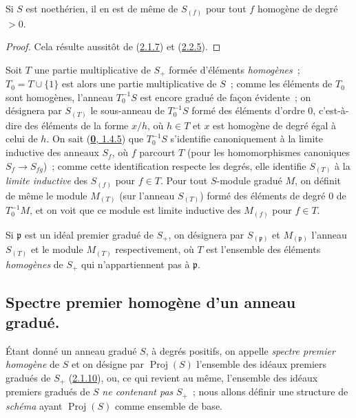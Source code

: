 \begin{corollary}[2.2.6]
\label{II.2.2.6-fr}
Si $S$ est noethérien, il en est de même de $S_{(f)}$ pour tout $f$ homogène
de degré $>0$.
\end{corollary}

\begin{proof}
Cela résulte aussitôt de (\hyperref[II.2.1.7-fr]{2.1.7}) et
(\hyperref[II.2.2.5-fr]{2.2.5}).
\end{proof}

\begin{env}[2.2.7]
\label{II.2.2.7-fr}
Soit $T$ une partie multiplicative de $S_+$ formée d'éléments
\emph{homogènes}~; $T_0=T\cup\{1\}$ est alors une partie multiplicative de
$S$~; comme les éléments de $T_0$ sont homogènes, l'anneau $T_0^{-1}S$ est
encore gradué de façon évidente~; on désignera par $S_{(T)}$ le sous-anneau
de $T_0^{-1}S$ formé des éléments d'ordre $0$, c'est-à-dire des éléments de
la forme $x/h$, où $h\in T$ et $x$ est homogène de degré égal à celui de
$h$. On sait (\hyperref[0.1.4.5-fr]{\textbf{0}, 1.4.5}) que $T_0^{-1}S$ s'identifie
canoniquement à la limite inductive des anneaux $S_f$, où $f$ parcourt $T$
(pour les homomorphismes canoniques $S_f\to S_{fg}$)~; comme cette
identification respecte les degrés, elle identifie $S_{(T)}$ à la
\emph{limite inductive} des $S_{(f)}$ pour $f\in T$. Pour tout $S$-module
gradué $M$, on définit de même le module $M_{(T)}$ (sur l'anneau $S_{(T)}$)
formé des éléments de degré $0$ de $T_0^{-1}M$, et on voit que ce module est
limite inductive des $M_{(f)}$ pour $f\in T$.

Si $\mathfrak{p}$ est un idéal premier gradué de $S_+$, on désignera par
$S_{(\mathfrak{p})}$ et $M_{(\mathfrak{p})}$ l'anneau $S_{(T)}$ et le
module $M_{(T)}$ respectivement, où $T$ est l'ensemble des éléments
\emph{homogènes} de $S_+$ qui n'appartiennent pas à $\mathfrak{p}$.
\end{env}

\subsection{Spectre premier homogène d'un anneau gradué.}
\label{subsection:II.2.3-fr}

\begin{env}[2.3.1]
\label{II.2.3.1-fr}
Étant donné un anneau gradué $S$, à degrés positifs, on appelle
\emph{spectre premier homogène} de $S$ et on désigne par
$\operatorname{Proj}(S)$ l'ensemble des idéaux premiers gradués de $S_+$
(\hyperref[II.2.1.10-fr]{2.1.10}), ou, ce qui revient au même, l'ensemble
des idéaux premiers gradués de $S$ \emph{ne contenant pas} $S_+$~; nous
allons définir une structure de \emph{schéma} ayant
$\operatorname{Proj}(S)$ comme ensemble de base.
\end{env}

